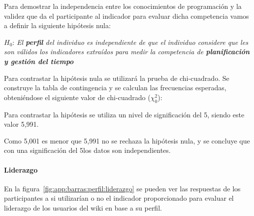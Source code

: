 Para demostrar la independencia entre los conocimientos de programación y la validez que da el participante al indicador para evaluar dicha competencia vamos a definir la siguiente hipótesis nula:

\begin{mdframed}[style=hipotesis0]
$H_0$: \emph{El \textbf{perfil} del individuo es independiente de que el individuo considere que les son válidos los indicadores extraídos para medir la competencia de \textbf{planificación y gestión del tiempo}}
\end{mdframed}

Para contrastar la hipótesis nula se utilizará la prueba de chi-cuadrado. Se construye la tabla de contingencia y se calculan las frecuencias esperadas, obteniéndose el siguiente valor de chi-cuadrado ($\chi^2_0$): 

\begin{center}
\end{center}

Para contrastar la hipótesis se utiliza un nivel de significación del 5\percentage, siendo este valor 5,991. 

\begin{center}
\end{center}

Como 5,001 es menor que 5,991 no se rechaza la hipótesis nula, y se concluye que con una significación del 5\percentage{ }los datos son independientes.

\begin{center}
\end{center}

\paragraph*{Liderazgo}
 
En la figura~\ref{fig:app:barras:perfil:liderazgo} se pueden ver las respuestas de los participantes a si utilizarían o no el indicador proporcionado para evaluar el liderazgo de los usuarios del wiki en base a su perfil.

